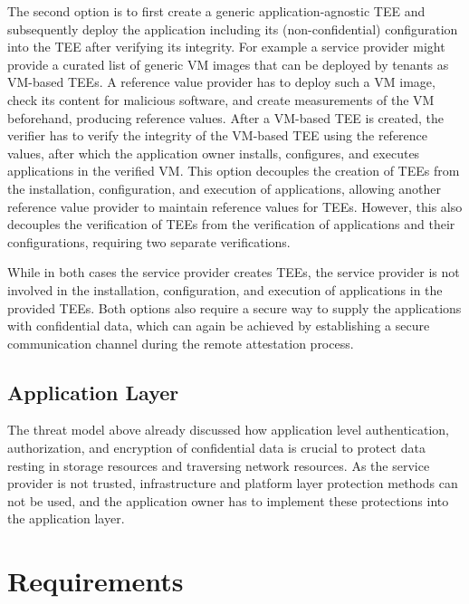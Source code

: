 \begin{description}[style=standard]
    The second option is to first create a generic application-agnostic TEE and
    subsequently deploy the application including its (non-confidential)
    configuration into the TEE after verifying its integrity. For example a
    service provider might provide a curated list of generic VM images that can
    be deployed by tenants as VM-based TEEs. A reference value provider has to
    deploy such a VM image, check its content for malicious software, and create
    measurements of the VM beforehand, producing reference values. After a
    VM-based TEE is created, the verifier has to verify the integrity of the
    VM-based TEE using the reference values, after which the application owner
    installs, configures, and executes applications in the verified VM. This
    option decouples the creation of TEEs from the installation, configuration,
    and execution of applications, allowing another reference value provider to
    maintain reference values for TEEs. However, this also decouples the
    verification of TEEs from the verification of applications and their
    configurations, requiring two separate verifications.

    While in both cases the service provider creates TEEs, the service provider
    is not involved in the installation, configuration, and execution of
    applications in the provided TEEs. Both options also require a secure way to
    supply the applications with confidential data, which can again be achieved
    by establishing a secure communication channel during the remote attestation
    process.
\end{description}

\subsection{Application Layer}

The threat model above already discussed how application level authentication,
authorization, and encryption of confidential data is crucial to protect data
resting in storage resources and traversing network resources. As the service
provider is not trusted, infrastructure and platform layer protection methods
can not be used, and the application owner has to implement these protections
into the application layer.

\section{Requirements}
\label{sec:requirements}

